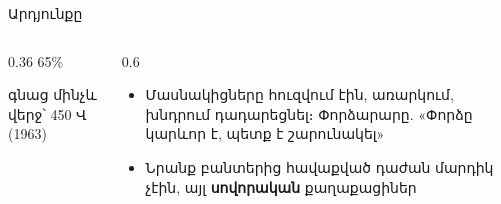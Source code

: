 \begin{frame}{Արդյունքը}
  \begin{columns}[c]
    \begin{column}{0.36\textwidth}
      \centering
      {\blackfont\fontsize{58}{60}\selectfont\color{amRed} 65\%}\par\smallskip
      {\small գնաց մինչև վերջ՝ 450 Վ (1963)}
    \end{column}
    \begin{column}{0.6\textwidth}
      \begin{itemize}
        \item Մասնակիցները հուզվում էին, առարկում, խնդրում դադարեցնել։ Փորձարարը. «Փորձը կարևոր է, պետք է շարունակել»
        \item<2-> Նրանք բանտերից հավաքված դաժան մարդիկ չէին, այլ \textbf{սովորական} քաղաքացիներ
      \end{itemize}
    \end{column}
  \end{columns}
\end{frame}

